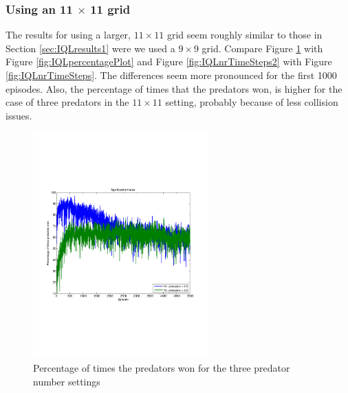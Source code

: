 \FloatBarrier
\clearpage
\subsubsection{Using an 11 $\times$ 11 grid}

The results for using a larger, $11 \times 11$ grid seem roughly similar to those in Section \ref{sec:IQLresults1} were we used a $9 \times 9$ grid. Compare Figure \ref{fig:IQLpercentagePlot2} with Figure \ref{fig:IQLpercentagePlot} and Figure \ref{fig:IQLnrTimeSteps2} with Figure \ref{fig:IQLnrTimeSteps}. The differences seem more pronounced for the first 1000 episodes. Also, the percentage of times that the predators won, is  higher for the case of three predators in the $11 \times 11$ setting, probably because of less collision issues.

\begin{figure}[hbt]
\centering
\includegraphics[bb = 0.6in 3in 7.9in 8.3in,clip,width=0.6\textwidth]
{IQLpercentageWinning5000episodesavg200trials.pdf} 
\caption{Percentage of times the predators won for the three predator number settings}
\label{fig:IQLpercentagePlot2}
\end{figure}
